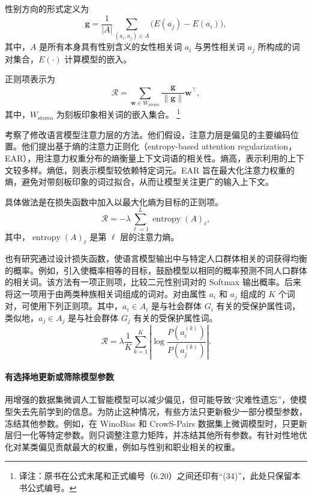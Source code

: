 性别方向的形式定义为
\begin{equation}
\symbf{g}=\frac{1}{|A|}\sum_{(a_i,a_j)\in A}\bigl(E(a_j)-E(a_i)\bigr),
\label{eq:ch06-gender-direction}
\end{equation}
其中，$A$ 是所有本身具有性别含义的女性相关词 $a_i$ 与男性相关词 $a_j$ 所构成的词对集合，$E(\cdot)$ 计算模型的嵌入。

正则项表示为
\begin{equation}
\mathcal{R}=\sum_{\symbf{w}\in W_{\mathrm{stereo}}}
\frac{\symbf{g}}{\lVert\symbf{g}\rVert}\symbf{w}^{\top},
\label{eq:ch06-projection-regularization}
\end{equation}
其中，$W_{\mathrm{stereo}}$ 为刻板印象相关词的嵌入集合。%
\footnote{译注：原书在公式末尾和正式编号（6.20）之间还印有“(34)”，此处只保留本书公式编号。}

考察了修改语言模型注意力层的方法。他们假设，注意力层是偏见的主要编码位置。他们提出基于熵的注意力正则化（entropy-based attention regularization，EAR），用注意力权重分布的熵衡量上下文词语的相关性。熵高，表示利用的上下文较多样。熵低，则表示模型较依赖特定词元。EAR 旨在最大化注意力权重的熵，避免对带刻板印象的词过拟合，从而让模型关注更广的输入上下文。

具体做法是在损失函数中加入以最大化熵为目标的正则项。
\begin{equation}
\mathcal{R}=-\lambda\sum_{\ell=1}^{L}\operatorname{entropy}(A)_\ell,
\label{eq:ch06-attention-entropy}
\end{equation}
其中，$\operatorname{entropy}(A)_\ell$ 是第 $\ell$ 层的注意力熵。

也有研究通过设计损失函数，使语言模型输出中与特定人口群体相关的词获得均衡的概率。例如，引入使概率相等的目标，鼓励模型以相同的概率预测不同人口群体的相关词。该方法有一项正则项，比较二元性别词对的 Softmax 输出概率。后来将这一项用于由两类种族相关词组成的词对。对由属性 $a_i$ 和 $a_j$ 组成的 $K$ 个词对，可使用下列正则项。其中，$a_i\in A_i$ 是与社会群体 $G_i$ 有关的受保护属性词，类似地，$a_j\in A_j$ 是与社会群体 $G_j$ 有关的受保护属性词。
\begin{equation}
\mathcal{R}=\lambda\frac{1}{K}\sum_{k=1}^{K}
  \left|\log\frac{P(a_i^{(k)})}{P(a_j^{(k)})}\right|.
\label{eq:ch06-equalizing-regularization}
\end{equation}

\paragraph*{有选择地更新或筛除模型参数}
用增强的数据集微调人工智能模型可以减少偏见，但可能导致“灾难性遗忘”，使模型失去先前学到的信息。为防止这种情况，有些方法只更新极少一部分模型参数，冻结其他参数。例如，在 WinoBias 和 CrowS-Pairs 数据集上微调模型时，只更新层归一化等特定参数。则只调整注意力矩阵，并冻结其他所有参数。有针对性地优化对某类偏见贡献最大的权重，例如与性别和职业相关的权重。

